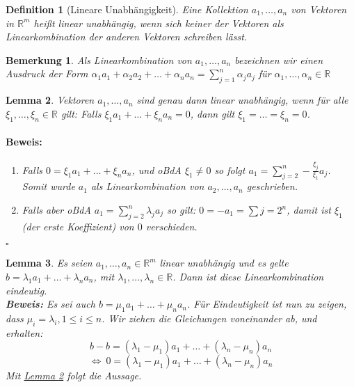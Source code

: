 \documentclass{report}
\newcommand{\lb}{\lambda}
\newcommand{\R}{\mathbb{R}}
\newcommand{\al}{\alpha}
\theoremstyle{customrem}
\newtheorem*{bem}{Bemerkung}
\theoremstyle{customdef}
\newtheorem{definition}{Definition}[chapter]
\newtheorem{lem}[definition]{Lemma}
\renewenvironment{proof}{\vspace{-.75cm}\paragraph{Beweis: }}{\hfill$\square$}
\begin{document}
	\begin{definition}[Lineare Unabhängigkeit]
		Eine Kollektion $a_1, \dots, a_n$ von Vektoren in $\R^m$ heißt linear unabhängig, wenn sich keiner der Vektoren als Linearkombination der anderen Vektoren schreiben lässt.
	\end{definition}
	\begin{bem}
		Als Linearkombination von $a_1, \dots, a_n$ bezeichnen  wir einen Ausdruck der Form $\al_1a_1 + \al_2 a_2 + \ldots + \al_n a_n = \sum_{j=1}^n \al_j a_j$ für $\al_1, \dots, \al_n \in \R$
	\end{bem}

	\begin{lem}
		\label{lem10}
		Vektoren $a_1, \dots, a_n$ sind genau dann linear unabhängig, wenn für alle $\xi_1, \dots, \xi_n \in\R$ gilt: Falls $\xi_1a_1 + \dots + \xi_na_n = 0$, dann gilt $\xi_1 = \dots = \xi_n = 0$.\\
		\begin{proof}
			\begin{enumerate}
				\itemsep-.125cm
				\item Falls $0 = \xi_1 a_1 + \dots + \xi_n a_n$, und oBdA $\xi_1 \neq 0$ so folgt $a_1 = \sum_{j=2}^n -\frac{\xi_j}{\xi_1} a_j$. Somit wurde $a_1$ als Linearkombination von $a_2, \dots, a_n$ geschrieben.
				\item Falls aber oBdA $a_1 = \sum_{j=2}^n \lb_j a_j$ so gilt: $0 = -a_1 = \sum{j=2}^n$, damit ist $\xi_1$ (der erste Koeffizient) von $0$ verschieden.
			\end{enumerate}
		\end{proof}
	\end{lem}
	\begin{lem}
		\label{lem11}
		Es seien $a_1, \dots, a_n \in \R^m$  linear unabhängig und es gelte $b = \lb_1a_1 + \dots + \lb_n a_n$, mit $\lb_1, \dots, \lb_n \in \R$. Dann ist diese Linearkombination eindeutig.\\
		\textbf{Beweis:} Es sei auch $b = \mu_1 a_1 + \dots + \mu_n a_n$. Für Eindeutigkeit ist nun zu zeigen, dass $\mu_i = \lb_i, 1 \le i \le n$.
		Wir ziehen die Gleichungen voneinander ab, und erhalten:
		$$
		b - b= (\lb_1 - \mu_1) a_1 + \ldots + (\lb_n - \mu_n) a_n$$$$
		\Leftrightarrow \ 0 = (\lb_1 - \mu_1) a_1 + \ldots + (\lb_n - \mu_n) a_n
		$$
		Mit \hyperref[lem10]{Lemma \ref{lem10}} folgt die Aussage.
	\end{lem}
\end{document}
